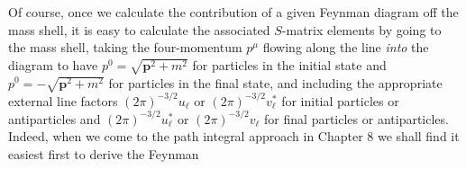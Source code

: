 Of course, once we calculate the contribution of a given Feynman diagram off
the mass shell, it is easy to calculate the associated $S$-matrix elements by
going to the mass shell, taking the four-momentum $p^\mu$ flowing along the line
\textit{into} the diagram to have $p^0=\sqrt{\mathbf p^2+m^2}$ for particles in
the initial state and $p^0=-\sqrt{\mathbf p^2+m^2}$ for particles in the final
state, and including the appropriate external line factors
$(2\pi)^{-3/2}u_\ell$ or $(2\pi)^{-3/2}v_\ell^*$ for initial particles or
antiparticles and $(2\pi)^{-3/2}u_\ell^*$ or $(2\pi)^{-3/2}v_\ell$ for final
particles or antiparticles. Indeed, when we come to the path integral approach
in Chapter 8 we shall find it easiest first to derive the Feynman\space%
